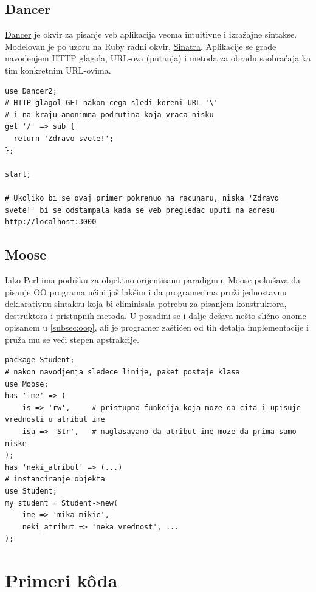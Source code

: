 \documentclass[a4paper]{article}
\begin{document}
\subsection{Dancer}

\href{http://perldancer.org/}{Dancer} je okvir za pisanje veb aplikacija veoma intuitivne i izražajne sintakse. Modelovan je po uzoru na Ruby radni okvir, \href{http://sinatrarb.com/}{Sinatra}. Aplikacije se grade navođenjem HTTP glagola, URL-ova (putanja) i metoda za obradu saobraćaja ka tim konkretnim URL-ovima. 

\begin{lstlisting}[label = dancer]
use Dancer2;
# HTTP glagol GET nakon cega sledi koreni URL '\'
# i na kraju anonimna podrutina koja vraca nisku
get '/' => sub { 
  return 'Zdravo svete!';
};
 
start;

# Ukoliko bi se ovaj primer pokrenuo na racunaru, niska 'Zdravo svete!' bi se odstampala kada se veb pregledac uputi na adresu http://localhost:3000 

\end{lstlisting}

\subsection{Moose}

Iako Perl ima podršku za objektno orijentisanu paradigmu, \href{https://metacpan.org/pod/Moose}{Moose} pokušava da pisanje OO programa učini još lakšim i da programerima pruži jednostavnu deklarativnu sintaksu koja bi eliminisala potrebu za pisanjem konstruktora, destruktora i pristupnih metoda. U pozadini se i dalje dešava nešto slično onome opisanom u \ref{subsec:oop}, ali je programer zaštićen od tih detalja implementacije i pruža mu se veći stepen apstrakcije.

\begin{lstlisting}[label = moose]
package Student;
# nakon navodjenja sledece linije, paket postaje klasa
use Moose;
has 'ime' => (
    is => 'rw',     # pristupna funkcija koja moze da cita i upisuje vrednosti u atribut ime
    isa => 'Str',   # naglasavamo da atribut ime moze da prima samo niske
);
has 'neki_atribut' => (...)
# instanciranje objekta
use Student;
my student = Student->new(
    ime => 'mika mikic',
    neki_atribut => 'neka vrednost', ...
);
\end{lstlisting}

\section{Primeri k\^{o}da}
\label{sec:primeri}
\end{document}
